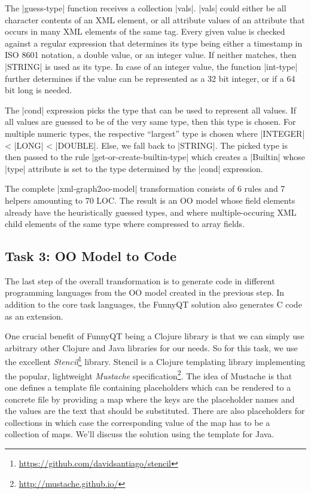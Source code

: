 \documentclass[submission]{eptcs}
\newcommand{\code}{\clojureinline}
\begin{document}
The \code|guess-type| function receives a collection \code|vals|.  \code|vals|
could either be all character contents of an XML element, or all attribute
values of an attribute that occurs in many XML elements of the same tag.  Every
given value is checked against a regular expression that determines its type
being either a timestamp in ISO 8601 notation, a double value, or an integer
value.  If neither matches, then \code|STRING| is used as its type.  In case of
an integer value, the function \code|int-type| further determines if the value
can be represented as a 32 bit integer, or if a 64 bit long is needed.

The \code|cond| expression picks the type that can be used to represent all
values.  If all values are guessed to be of the very same type, then this type
is chosen.  For multiple numeric types, the respective ``largest'' type is
chosen where \code|INTEGER| < \code|LONG| < \code|DOUBLE|.  Else, we fall back
to \code|STRING|.  The picked type is then passed to the rule
\code|get-or-create-builtin-type| which creates a \code|Builtin| whose
\code|type| attribute is set to the type determined by the \code|cond|
expression.

The complete \code|xml-graph2oo-model| transformation consists of 6 rules and 7
helpers amounting to 70 LOC.  The result is an OO model whose field elements
already have the heuristically guessed types, and where multiple-occuring XML
child elements of the same type where compressed to array fields.


\subsection{Task 3: OO Model to Code}
\label{sec:oo-model-to-code}

The last step of the overall transformation is to generate code in different
programming languages from the OO model created in the previous step.  In
addition to the core task languages, the FunnyQT solution also generates C code
as an extension.

One crucial benefit of FunnyQT being a Clojure library is that we can simply
use arbitrary other Clojure and Java libraries for our needs.  So for this
task, we use the excellent
\emph{Stencil}\footnote{\url{https://github.com/davidsantiago/stencil}}
library.  Stencil is a Clojure templating library implementing the popular,
lightweight \emph{Mustache}
specification\footnote{\url{http://mustache.github.io/}}.  The idea of Mustache
is that one defines a template file containing placeholders which can be
rendered to a concrete file by providing a map where the keys are the
placeholder names and the values are the text that should be substituted.
There are also placeholders for collections in which case the corresponding
value of the map has to be a collection of maps.  We'll discuss the solution
using the template for Java.
\end{document}
